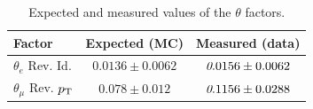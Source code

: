\begin{table}
  \begin{center} 
{\small \begin{tabular}{ l c c }
\hline Factor    &  Expected (MC) & Measured (data) \\ \hline
 $\theta_{e}$ Rev. Id.  & $0.0136\pm0.0062$  & ${\it 0.0156\pm0.0062}$  \\ 
 $\theta_{\mu}$ Rev. $p_{\rm T}$ & $0.078\pm0.012$ & ${\it 0.1156\pm0.0288}$ \\ \hline %

\end{tabular}}
\caption{ Expected and measured values of the $\theta$ factors. \label{table:background_theta}} 
\end{center}
\end{table} 


